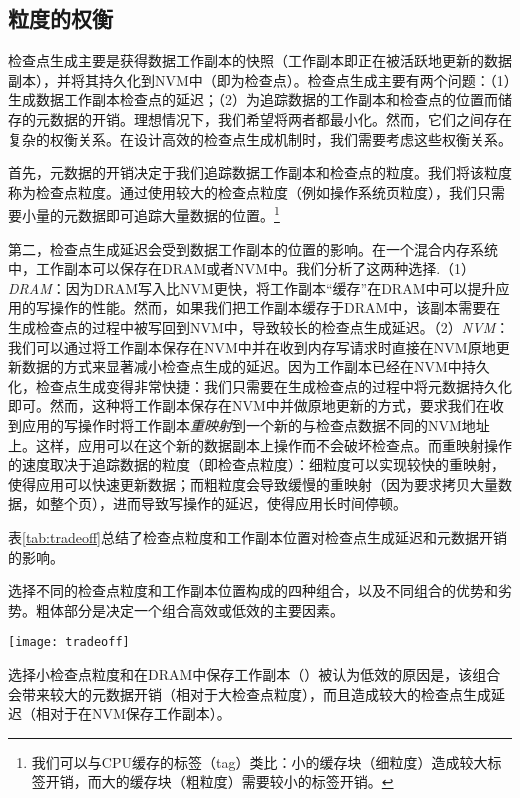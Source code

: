 \subsection{粒度的权衡}

检查点生成主要是获得数据工作副本的快照（工作副本即正在被活跃地更新的数据副本），并将其持久化到NVM中（即为检查点）。检查点生成主要有两个问题：（1）生成数据工作副本检查点的延迟；（2）为追踪数据的工作副本和检查点的位置而储存的元数据的开销。理想情况下，我们希望将两者都最小化。然而，它们之间存在复杂的权衡关系。在设计高效的检查点生成机制时，我们需要考虑这些权衡关系。

首先，元数据的开销决定于我们追踪数据工作副本和检查点的粒度。我们将该粒度称为检查点粒度。通过使用较大的检查点粒度（例如操作系统页粒度），我们只需要小量的元数据即可追踪大量数据的位置。\footnote{我们可以与CPU缓存的标签（tag）类比：小的缓存块（细粒度）造成较大标签开销，而大的缓存块（粗粒度）需要较小的标签开销。}

第二，检查点生成延迟会受到数据工作副本的位置的影响。在一个混合内存系统中，工作副本可以保存在DRAM或者NVM中。我们分析了这两种选择.（1）{\em DRAM}：因为DRAM写入比NVM更快，将工作副本“缓存”在DRAM中可以提升应用的写操作的性能。然而，如果我们把工作副本缓存于DRAM中，该副本需要在生成检查点的过程中被写回到NVM中，导致较长的检查点生成延迟。（2）{\em NVM}：我们可以通过将工作副本保存在NVM中并在收到内存写请求时直接在NVM原地更新数据的方式来显著减小检查点生成的延迟。因为工作副本已经在NVM中持久化，检查点生成变得非常快捷：我们只需要在生成检查点的过程中将元数据持久化即可。然而，这种将工作副本保存在NVM中并做原地更新的方式，要求我们在收到应用的写操作时将工作副本\emph{重映射}到一个新的与检查点数据不同的NVM地址上。这样，应用可以在这个新的数据副本上操作而不会破坏检查点。而重映射操作的速度取决于追踪数据的粒度（即检查点粒度）：细粒度可以实现较快的重映射，使得应用可以快速更新数据；而粗粒度会导致缓慢的重映射（因为要求拷贝大量数据，如整个页），进而导致写操作的延迟，使得应用长时间停顿。

表\ref{tab:tradeoff}总结了检查点粒度和工作副本位置对检查点生成延迟和元数据开销的影响。

\begin{table}[!h]
  \centering
  \caption{选择不同的检查点粒度和工作副本位置构成的四种组合，以及不同组合的优势和劣势。粗体部分是决定一个组合高效或低效的主要因素。}
  \texttt{[image: tradeoff]}
  \label{tab:tradeoff}
\end{table}

选择小检查点粒度和在DRAM中保存工作副本（）被认为低效的原因是，该组合会带来较大的元数据开销（相对于大检查点粒度），而且造成较大的检查点生成延迟（相对于在NVM保存工作副本）。

